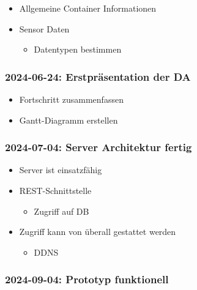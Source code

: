 \documentclass[
    headings=optiontotocandhead,%
    twoside,
    numbers=noenddot,%
    12pt, %
    titlepage, %
    parskip=full, %
    listof=leveldown, 
    numbers=noenddot, %
    a4paper,DIV=14,
    BCOR=15mm,
]{scrbook}
\providecommand{\tightlist}{%
  \setlength{\itemsep}{0pt}\setlength{\parskip}{0pt}}
\begin{document}
\begin{itemize}
\tightlist
\item
  Allgemeine Container Informationen
\item
  Sensor Daten

  \begin{itemize}
  \tightlist
  \item
    Datentypen bestimmen
  \end{itemize}
\end{itemize}

\hypertarget{erstpruxe4sentation-der-da}{%
\subsubsection{2024-06-24: Erstpräsentation der
DA}\label{erstpruxe4sentation-der-da}}

\begin{itemize}
\tightlist
\item
  Fortschritt zusammenfassen
\item
  Gantt-Diagramm erstellen
\end{itemize}

\hypertarget{server-architektur-fertig}{%
\subsubsection{2024-07-04: Server Architektur
fertig}\label{server-architektur-fertig}}

\begin{itemize}
\tightlist
\item
  Server ist einsatzfähig
\item
  REST-Schnittstelle

  \begin{itemize}
  \tightlist
  \item
    Zugriff auf DB
  \end{itemize}
\item
  Zugriff kann von überall gestattet werden

  \begin{itemize}
  \tightlist
  \item
    DDNS
  \end{itemize}
\end{itemize}

\hypertarget{prototyp-funktionell}{%
\subsubsection{2024-09-04: Prototyp
funktionell}\label{prototyp-funktionell}}
\end{document}
